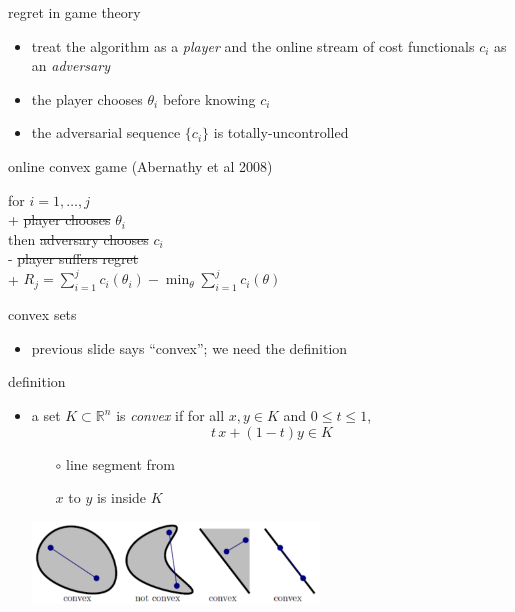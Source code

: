 \documentclass[svgnames,
               hyperref={colorlinks,citecolor=DeepPink4,linkcolor=FireBrick,urlcolor=Maroon},
               usepdftitle=false]  %
               {beamer}
\newcommand{\RR}{\mathbb{R}}
\newcommand{\ds}{\displaystyle}
\begin{document}
\begin{frame}{regret in game theory}

\begin{itemize}
\item treat the algorithm as a \emph{player} and the online stream of cost functionals $c_i$ as an \emph{adversary}
\item the player chooses $\theta_{i}$ \alert{before} knowing $c_{i}$
\item the adversarial sequence $\{c_i\}$ is totally-uncontrolled
\end{itemize}

\begin{block}{online convex game (Abernathy et al 2008)}
\begin{pseudo*}
for $i = 1,\dots,j$ \\+
    \st{player chooses} $\theta_{i}$ \\
    then \st{adversary chooses} $c_{i}$ \\-
\st{player suffers regret} \\+
    $\ds R_j = \sum_{i=1}^j c_i(\theta_i) - \min_\theta \sum_{i=1}^j c_i(\theta)$
\end{pseudo*}
\end{block}
\end{frame}


\begin{frame}{convex sets}

\begin{itemize}
\item previous slide says ``convex''; we need the definition
\end{itemize}

\begin{block}{definition}
\begin{itemize}
\item a set $K \subset \RR^n$ is \emph{convex} if for all $x,y \in K$ and $0 \le t \le 1$,
  $$t\, x + (1-t) y \in K$$

    \begin{itemize}
    \item[$\circ$] line segment from
    \item[]  $x$ to $y$ is inside $K$
    \end{itemize}

\vspace{-8mm}
\hfill \includegraphics[width=0.6\textwidth]{figs/convex}
\end{itemize}
\end{block}
\end{frame}
\end{document}
